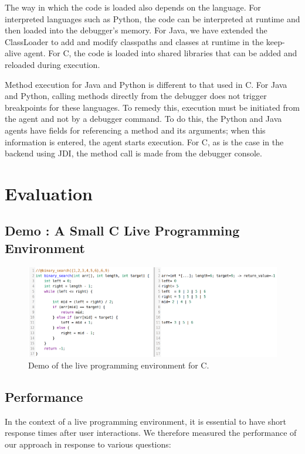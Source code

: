 \documentclass[english,submission]{programming}
\begin{document}
The way in which the code is loaded also depends on the language. 
For interpreted languages such as Python, the code can be interpreted at runtime and then loaded into the debugger's memory. 
For Java, we have extended the ClassLoader to add and modify classpaths and classes at runtime in the keep-alive agent. 
For C, the code is loaded into shared libraries that can be added and reloaded during execution.

Method execution for Java and Python is different to that used in C. 
For Java and Python, calling methods directly from the debugger does not trigger breakpoints for these languages. 
To remedy this, execution must be initiated from the agent and not by a debugger command. 
To do this, the Python and Java agents have fields for referencing a method and its arguments; when this information is entered, the agent starts execution.
For C, as is the case in the backend using JDI, the method call is made from the debugger console.
\section{Evaluation}
\label{sec:evaluation}
\subsection{Demo : A Small C Live Programming Environment}
\label{sec:demo-small-c}
\begin{figure}[h]
  \centering
  \includegraphics[width=\linewidth]{img/demo/c.png}
  \caption{Demo of the live programming environment for C.}
  \label{fig:demo}
\end{figure}


\subsection{Performance}
\label{sec:performance}

In the context of a live programming environment, it is essential to have short response times after user interactions. 
We therefore measured the performance of our approach in response to various questions:
\end{document}
